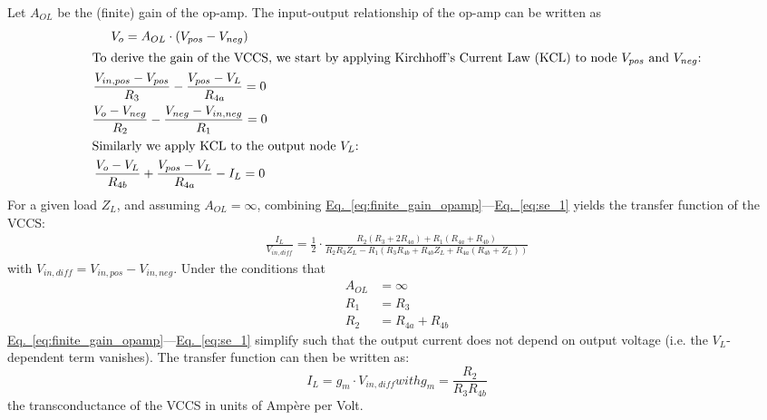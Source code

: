 \documentclass[10pt]{article}
\newcommand{\briefeqlink}[1]{\hyperref[#1]{Eq.~\ref*{#1}}\xspace }
\begin{document}
Let $A_{OL}$ be the (finite) gain of the op-amp. The input-output relationship of the op-amp can be written as
\begin{subequations}
\label{eq:prerequisites}
\begin{gather}
\label{eq:finite_gain_opamp}
V_o = A_{OL}\cdot(V_{pos}-V_{neg})\\
\intertext{To derive the gain of the VCCS, we start by applying Kirchhoff's Current Law (KCL) to node $V_{pos}$ and $V_{neg}$:}
\label{eq:finite_gain_opamp2}
\frac{V_{in,pos}-V_{pos}}{R_3} - \frac{V_{pos} - V_L}{R_{4a}}=0\\
\frac{V_o - V_{neg}}{R_2} - \frac{V_{neg} - V_{in,neg}}{R_1}=0\\
\intertext{Similarly we apply KCL to the output node $V_L$:}
\frac{V_o-V_L}{R_{4b}} + \frac{V_{pos}-V_L}{R_{4a}} - I_L = 0\label{eq:se_1}
\end{gather}
\end{subequations}
For a given load $Z_L$, and assuming $A_{OL}=\infty$, combining \briefeqlink{eq:finite_gain_opamp}---\briefeqlink{eq:se_1} yields the transfer function of the VCCS:
\begin{align}
\label{eq:single_ended_howland_transfer_function}
\frac{I_L}{V_{in,diff}} = \frac{1}{2}\cdot\frac{R_2 (R_3 + 2 R_{4a}) + R_1(R_{4a} + R_{4b})}{R_2 R_3 Z_L - R_1 (R_3 R_{4b} + R_{4b} Z_L + R_{4a} (R_{4b} + Z_L))}
\end{align}
with $V_{in,diff}=V_{in,pos}-V_{in,neg}$. Under the conditions that
\begin{subequations}
\label{eq:single_ended_howland_conditions}
\begin{align}
A_{OL} &= \infty\\
R_1 &= R_3\label{eq:single_ended_howland_conditions_r1}\\
R_2 &= R_{4a} + R_{4b}\label{eq:single_ended_howland_conditions_r2}
\end{align}
\end{subequations}
\briefeqlink{eq:finite_gain_opamp}---\briefeqlink{eq:se_1} simplify such that the output current does not depend on output voltage (i.e. the $V_L$-dependent term vanishes). The transfer function can then be written as:
\begin{subequations}
\label{eq:single_ended_gain}
\begin{equation}
I_L = g_m\cdot V_{in,diff}
\end{equation}
with
\begin{equation}
g_m = \frac{R_2}{R_3R_{4b}}
\end{equation}
\end{subequations}
the transconductance of the VCCS in units of Amp\`{e}re per Volt.
\end{document}
